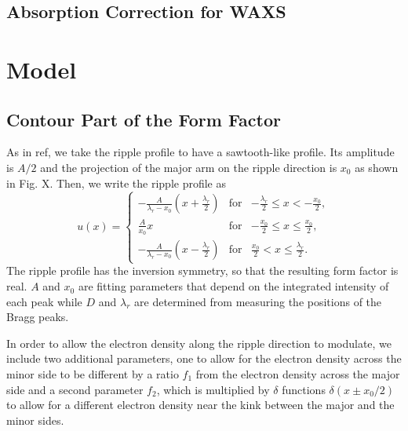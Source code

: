 \subsection{Absorption Correction for WAXS}

\section{Model}
\subsection{Contour Part of the Form Factor}
As in ref, we take the ripple profile to have a sawtooth-like profile. Its
amplitude is  $A/2$ and the projection of the major arm on the 
ripple direction is $x_0$ as shown in Fig. X. Then, we write the ripple 
profile as
\begin{equation}
  u(x) = \left\{
    \begin{array}{ccc}
    -\frac{A}{\lambda_r-x_0}\left(x+\frac{\lambda_r}{2}\right) 
      & \text{for} 
      & -\frac{\lambda_r}{2} \leq x < -\frac{x_0}{2}, \\
    \frac{A}{x_0}x 
      & \text{for} 
      & -\frac{x_0}{2} \leq x \leq \frac{x_0}{2}, \\
    -\frac{A}{\lambda_r-x_0} \left(x-\frac{\lambda_r}{2}\right)
      & \text{for} 
      & \frac{x_0}{2} < x \leq \frac{\lambda_r}{2}.
    \end{array} \right.
\end{equation}
The ripple profile has the inversion symmetry, so that the resulting
form factor is real. $A$ and $x_0$ are fitting parameters that depend 
on the integrated intensity of each peak while $D$ and $\lambda_r$ are
determined from measuring the positions of the Bragg peaks.

In order to allow the electron density along the ripple direction to 
modulate, we include two additional parameters, one to allow for the electron
density across the minor side to be different by a ratio $f_1$ from the 
electron density across the major side and a second parameter $f_2$, which
is multiplied by $\delta$ functions $\delta(x \pm x_0/2)$ to allow for 
a different electron density near the kink between the major and the minor
sides. 


